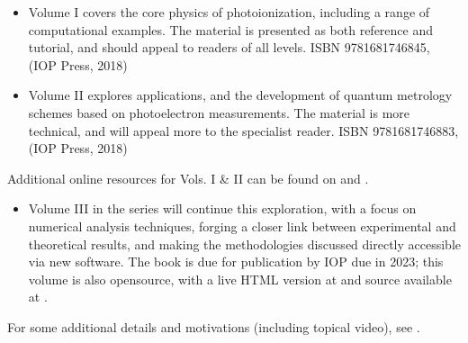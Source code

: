 \documentclass[letterpaper,table,10pt,english]{jupyterBook}
\begin{document}
\sphinxAtStartPar
{}
\begin{itemize}
\item {} 
\sphinxAtStartPar
Volume I covers the core physics of photoionization, including a range of computational examples. The material is presented as both reference and tutorial, and should appeal to readers of all levels. ISBN 978\sphinxhyphen{}1\sphinxhyphen{}6817\sphinxhyphen{}4684\sphinxhyphen{}5,  (IOP Press, 2018)

\item {} 
\sphinxAtStartPar
Volume II explores applications, and the development of quantum metrology schemes based on photoelectron measurements. The material is more technical, and will appeal more to the specialist reader. ISBN 978\sphinxhyphen{}1\sphinxhyphen{}6817\sphinxhyphen{}4688\sphinxhyphen{}3,  (IOP Press, 2018)

\end{itemize}

\sphinxAtStartPar
Additional online resources for Vols. I \& II can be found on  and .
\begin{itemize}
\item {} 
\sphinxAtStartPar
Volume III in the series will continue this exploration, with a focus on numerical analysis techniques, forging a closer link between experimental and theoretical results, and making the methodologies discussed directly accessible via new software. The book is due for publication by IOP due in 2023; this volume is also open\sphinxhyphen{}source, with a live HTML version at  and source available at .

\end{itemize}

\sphinxAtStartPar
For some additional details and motivations (including topical video), see .

\begin{DUlineblock}{0em}
\item[] 
\end{DUlineblock}
\end{document}
